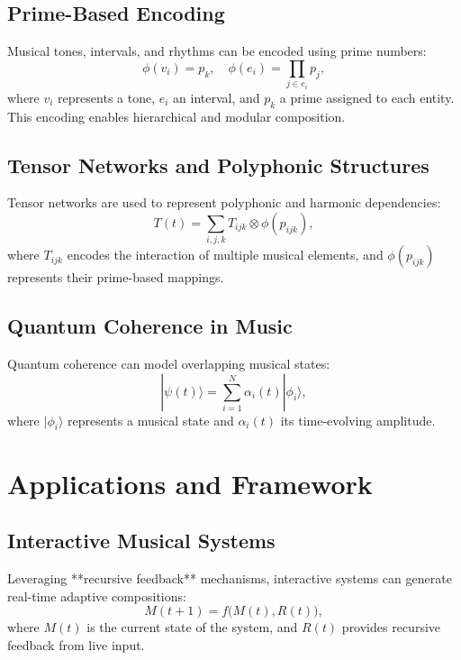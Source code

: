 \documentclass{article}
\theoremstyle{plain}
\begin{document}
\subsection{Prime-Based Encoding}
Musical tones, intervals, and rhythms can be encoded using prime numbers:
\begin{equation}
\phi(v_i) = p_k, \quad \phi(e_i) = \prod_{j \in e_i} p_j,
\end{equation}
where $v_i$ represents a tone, $e_i$ an interval, and $p_k$ a prime assigned to each entity. This encoding enables hierarchical and modular composition.

\subsection{Tensor Networks and Polyphonic Structures}
Tensor networks are used to represent polyphonic and harmonic dependencies:\
\begin{equation}
T(t) = \sum_{i,j,k} T_{ijk} \otimes \phi(p_{ijk}),
\end{equation}
where $T_{ijk}$ encodes the interaction of multiple musical elements, and $\phi(p_{ijk})$ represents their prime-based mappings.

\subsection{Quantum Coherence in Music}
Quantum coherence can model overlapping musical states:\
\begin{equation}
|\psi(t)\rangle = \sum_{i=1}^N \alpha_i(t) |\phi_i\rangle,
\end{equation}
where $|\phi_i\rangle$ represents a musical state and $\alpha_i(t)$ its time-evolving amplitude.

\section{Applications and Framework}

\subsection{Interactive Musical Systems}
Leveraging **recursive feedback** mechanisms, interactive systems can generate real-time adaptive compositions:\
\begin{equation}
M(t+1) = f\big(M(t), R(t)\big),
\end{equation}
where $M(t)$ is the current state of the system, and $R(t)$ provides recursive feedback from live input.
\end{document}
